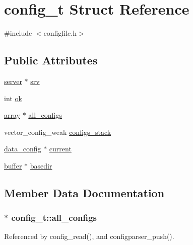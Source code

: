 \hypertarget{structconfig__t}{\section{config\-\_\-t Struct Reference}
\label{structconfig__t}
}


{\ttfamily \#include $<$configfile.\-h$>$}

\subsection*{Public Attributes}
\begin{DoxyCompactItemize}
\item 
\hyperlink{structserver}{server} $\ast$ \hyperlink{structconfig__t_a8d3dd3a1ab542e07c899c3b056acd463}{srv}
\item 
int \hyperlink{structconfig__t_a2207e224465796e696bffaf7e843001d}{ok}
\item 
\hyperlink{structarray}{array} $\ast$ \hyperlink{structconfig__t_a0a506e92d7f757915bd66ef2d68b4873}{all\-\_\-configs}
\item 
vector\-\_\-config\-\_\-weak \hyperlink{structconfig__t_ab150672069b689345bc1c38ccc10ad99}{configs\-\_\-stack}
\item 
\hyperlink{structdata__config}{data\-\_\-config} $\ast$ \hyperlink{structconfig__t_a0a6be065c5a9885b55ed452a4120ec02}{current}
\item 
\hyperlink{structbuffer}{buffer} $\ast$ \hyperlink{structconfig__t_a69fbe5323e638659471f5df92e7b478e}{basedir}
\end{DoxyCompactItemize}


\subsection{Member Data Documentation}
\hypertarget{structconfig__t_a0a506e92d7f757915bd66ef2d68b4873}{
\subsubsection[{all\-\_\-configs}]{$\ast$ config\-\_\-t\-::all\-\_\-configs}}\label{structconfig__t_a0a506e92d7f757915bd66ef2d68b4873}


Referenced by config\-\_\-read(), and configparser\-\_\-push().


